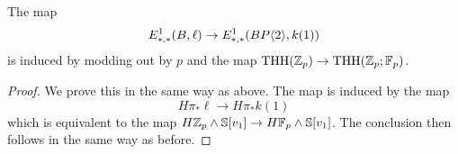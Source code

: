 \begin{prop}
	The map 
	\[
	E_{*,*}^1(B,\ell)\to E_{*,*}^1(BP\langle 2 \rangle,k(1))
	\]
	is induced by modding out by $p$ and the map $\operatorname{THH}(\mathbb{Z}_p)\to \operatorname{THH}(\mathbb{Z}_p;\mathbb{F}_p)$. 
\end{prop}
\begin{proof}
We prove this in the same way as above. The map is induced by the map 
\[H\pi_*\ell\to H\pi_*k(1)\] 
which is equivalent to the map $H\mathbb{Z}_p\wedge \mathbb{S}[v_1]\to H\mathbb{F}_p\wedge \mathbb{S}[v_1]$.  The conclusion then follows in the same way as before.
\end{proof}
\begin{comment}
\textcolor{blue}{I think the map 
\[
\THH(H\Z_p)\to \THH(H\Z_p;H\F_p)
\]
is induced by projecting $\gamma_{pk}$ to $u_1^{k-1}\lambda_1$}. Indeed, this map is the edge homomorphism for the $v_0$-BSS, and the Bockstein spectral sequence takes the form 
\[
\THH_*(H\Z_p;H\F_p)[v_0]\implies \THH_*(H\F_p).
\]
Since the only classes in filtration 0 which are in the correct degree are $u_1^{k-1}\lambda_1$, it follows that $\gamma_{pk}$ projects onto $u_1^{k-1}\lambda_1$. 
\end{comment}
\begin{comment}
\begin{rmk}
	Since we have the identification 
	\[
	E_{*,*}^{p+2}(\ell)\cong E_{*,*}^{p+2}(\ell,H\Z_p)\otimes_{\Z_p} \Z_p[v_1]
	\]
	and recall that $E_{*,*}^{p+2}(\ell,H\Z_p)$ is an associated graded of $\THH_*(\ell; H\Z_p)$. In particular, we have 
	\[
	E^{p+2}(\ell)\cong E(\sigma v_1)\otimes_{\Z_p} E_{\Z_p}(a_i, b_i\mid i\geq 1 )/(p^{\nu_p(i)+1}a_i, p^{\nu_p(i)+1}b_i, \lambda_1a_i, \lambda_1b_i),
	\]
	in the abutment there are hidden extensions $p\gamma_1 = \sigma v_1$ and $\gamma_1a_i = b_i$. 
	In [AHL], they determine the differentials for the spectral sequence 
	\[
	\THH_*(\ell;\Z_p)[v_1]\implies \THH_*(\ell).
	\]
	They found that the $b_i$ are permanent cycles and that all the differentials are derived from the formula
	\[
	d_{p^n+p^{n-1}+\cdots +p}(p^{n-1}a_{kp^{n-1}}) \dot{=} (k-1)v_1^{p^n+\cdots +p} b_{(k-1)p^{n-1}}.
	\]
	These uniquely correspond to the following differentials in the HMSS for the pair $(\ell,\ell)$
	\[
	d_{p^n+p^{n-1}+\cdots +p+1}(p^{n-1}a_{kp^{n-1}}) \dot{=} (k-1)v_1^{p^n+\cdots +p} b_{(k-1)p^{n-1}}.
	\]
	The fact that the differential has length increased by one follows from the fact that the $b_i$ are in May filtration 1. 
\end{rmk}
\end{comment}

